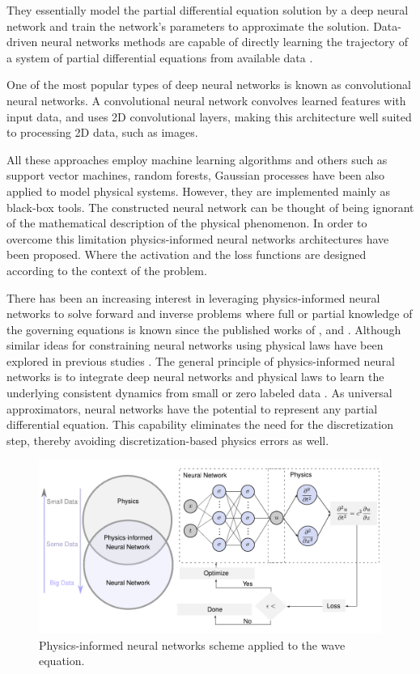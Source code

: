 \documentclass[11pt,twoside]{article}
\begin{document}
They essentially model the partial differential equation solution by a deep neural network and train the network’s parameters to approximate 
the solution. Data-driven neural networks methods are capable of directly learning the trajectory of a system of partial differential 
equations from available data \citep{li_neural_2020,li_fourier_2021}.

One of the most popular types of deep neural networks is known as convolutional neural networks. A convolutional neural network convolves 
learned features with input data, and uses 2D convolutional layers, making this architecture well suited to processing 2D data, such as images.

All these approaches employ machine learning algorithms and others such as support vector machines, random forests, Gaussian processes have 
been also applied to model physical systems. However, they are implemented mainly as black-box tools. The constructed neural network can be 
thought of being ignorant of the mathematical description of the physical phenomenon. In order to overcome this limitation physics-informed 
neural networks architectures have been proposed. Where the activation and the loss functions are designed according to the context of the 
problem.

There has been an increasing interest in leveraging physics-informed neural networks to solve forward and inverse problems where full or 
partial knowledge of the governing equations is known since the published works of , 
 and . Although similar ideas for constraining neural networks using 
physical laws have been explored in previous studies \citep{lagaris_artificial_1998}. The general principle of physics-informed neural 
networks is to integrate deep neural networks and physical laws to learn the underlying consistent dynamics from small or zero labeled 
data \citep{karniadakis_physics-informed_2021}. As universal approximators, neural networks have the potential to represent any partial 
differential equation. This capability eliminates the need for the discretization step, thereby avoiding discretization-based physics errors 
as well. 

\begin{figure}[H]
\centering
    \includegraphics[width=1.0\textwidth]{figs/Escheme_PINN_waves.pdf}
    \caption{Physics-informed neural networks scheme applied to the wave equation.}
    \label{deep_learning_subset_architecture}
\end{figure}
\end{document}
